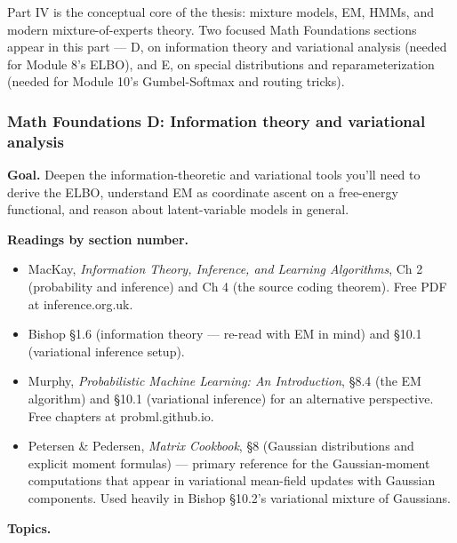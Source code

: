 Part IV is the conceptual core of the thesis: mixture models, EM, HMMs,
and modern mixture-of-experts theory. Two focused Math Foundations
sections appear in this part --- D, on information theory and
variational analysis (needed for Module 8's ELBO), and E, on special
distributions and reparameterization (needed for Module 10's
Gumbel-Softmax and routing tricks).

\subsubsection{Math Foundations D: Information theory and variational
analysis}\label{math-foundations-d-information-theory-and-variational-analysis}

\textbf{Goal.} Deepen the information-theoretic and variational tools
you'll need to derive the ELBO, understand EM as coordinate ascent on a
free-energy functional, and reason about latent-variable models in
general.

\textbf{Readings by section number.}

\begin{itemize}
\tightlist
\item
  MacKay, \emph{Information Theory, Inference, and Learning Algorithms},
  Ch 2 (probability and inference) and Ch 4 (the source coding theorem).
  Free PDF at inference.org.uk.
\item
  Bishop §1.6 (information theory --- re-read with EM in mind) and §10.1
  (variational inference setup).
\item
  Murphy, \emph{Probabilistic Machine Learning: An Introduction}, §8.4
  (the EM algorithm) and §10.1 (variational inference) for an
  alternative perspective. Free chapters at probml.github.io.
\item
  Petersen \& Pedersen, \emph{Matrix Cookbook}, §8 (Gaussian
  distributions and explicit moment formulas) --- primary reference for
  the Gaussian-moment computations that appear in variational mean-field
  updates with Gaussian components. Used heavily in Bishop §10.2's
  variational mixture of Gaussians.
\end{itemize}

\textbf{Topics.}

